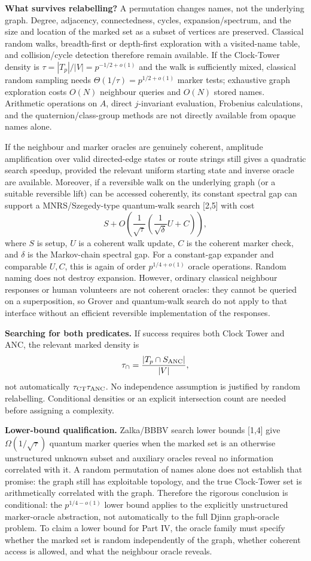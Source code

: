 \documentclass[10pt,a4paper]{article}
\begin{document}
\textbf{What survives relabelling?} A permutation changes names, not the underlying graph. Degree, adjacency, connectedness, cycles, expansion/spectrum, and the size and location of the marked set as a subset of vertices are preserved. Classical random walks, breadth-first or depth-first exploration with a visited-name table, and collision/cycle detection therefore remain available. If the Clock-Tower density is $\tau=|T_p|/|V|=p^{-1/2+o(1)}$ and the walk is sufficiently mixed, classical random sampling needs $\Theta(1/\tau)=p^{1/2+o(1)}$ marker tests; exhaustive graph exploration costs $O(N)$ neighbour queries and $O(N)$ stored names. Arithmetic operations on $A$, direct $j$-invariant evaluation, Frobenius calculations, and the quaternion/class-group methods are not directly available from opaque names alone.

If the neighbour and marker oracles are genuinely coherent, amplitude amplification over valid directed-edge states or route strings still gives a quadratic search speedup, provided the relevant uniform starting state and inverse oracle are available. Moreover, if a reversible walk on the underlying graph (or a suitable reversible lift) can be accessed coherently, its constant spectral gap can support a MNRS/Szegedy-type quantum-walk search [2,5] with cost
\[
S+O\!\left(\frac{1}{\sqrt{\tau}}
\left(\frac{1}{\sqrt{\delta}}U+C\right)\right),
\]
where $S$ is setup, $U$ is a coherent walk update, $C$ is the coherent marker check, and $\delta$ is the Markov-chain spectral gap. For a constant-gap expander and comparable $U,C$, this is again of order $p^{1/4+o(1)}$ oracle operations. Random naming does not destroy expansion. However, ordinary classical neighbour responses or human volunteers are not coherent oracles: they cannot be queried on a superposition, so Grover and quantum-walk search do not apply to that interface without an efficient reversible implementation of the responses.

\textbf{Searching for both predicates.} If success requires both Clock Tower and ANC, the relevant marked density is
\[
\tau_{\cap}=\frac{|T_p\cap S_{\rm ANC}|}{|V|},
\]
not automatically $\tau_{\rm CT}\tau_{\rm ANC}$. No independence assumption is justified by random relabelling. Conditional densities or an explicit intersection count are needed before assigning a complexity.

\textbf{Lower-bound qualification.} Zalka/BBBV search lower bounds [1,4] give $\Omega(1/\sqrt{\tau})$ quantum marker queries when the marked set is an otherwise unstructured unknown subset and auxiliary oracles reveal no information correlated with it. A random permutation of names alone does not establish that promise: the graph still has exploitable topology, and the true Clock-Tower set is arithmetically correlated with the graph. Therefore the rigorous conclusion is conditional: the $p^{1/4-o(1)}$ lower bound applies to the explicitly unstructured marker-oracle abstraction, not automatically to the full Djinn graph-oracle problem. To claim a lower bound for Part IV, the oracle family must specify whether the marked set is random independently of the graph, whether coherent access is allowed, and what the neighbour oracle reveals.
\end{document}
